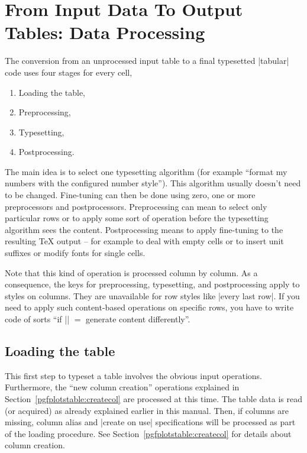 \documentclass[a4paper]{ltxdoc}
\begin{document}
\section{From Input Data To Output Tables: Data Processing}
\label{sec:data:processing}

The conversion from an unprocessed input table to a final typesetted |tabular|
code uses four stages for every cell,
%
\begin{enumerate}
    \item Loading the table,
    \item Preprocessing,
    \item Typesetting,
    \item Postprocessing.
\end{enumerate}
%
The main idea is to select one typesetting algorithm (for example ``format my
numbers with the configured number style''). This algorithm usually doesn't
need to be changed. Fine-tuning can then be done using zero, one or more
preprocessors and postprocessors. Preprocessing can mean to select only
particular rows or to apply some sort of operation before the typesetting
algorithm sees the content. Postprocessing means to apply fine-tuning to the
resulting \TeX{} output -- for example to deal with empty cells or to insert
unit suffixes or modify fonts for single cells.

Note that this kind of operation is processed column by column. As a
consequence, the keys for preprocessing, typesetting, and postprocessing apply
to styles on columns. They are unavailable for row styles like
|every last row|. If you need to apply such content-based operations on
specific rows, you have to write code of sorts ``if |\pgfplotstablerow| $=$
generate content differently''.


\subsection{Loading the table}

This first step to typeset a table involves the obvious input operations.
Furthermore, the ``new column creation'' operations explained in
Section~\ref{pgfplotstable:createcol} are processed at this time. The table
data is read (or acquired) as already explained earlier in this manual. Then,
if columns are missing, column alias and |create on use| specifications will be
processed as part of the loading procedure. See
Section~\ref{pgfplotstable:createcol} for details about column creation.
\end{document}
